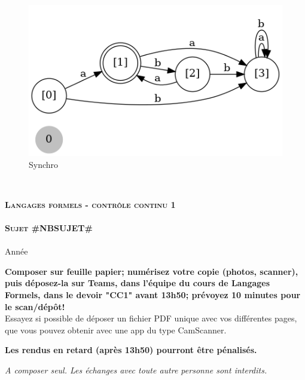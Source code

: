 \documentclass[]{article}
\begin{document}
\begin{enumerate}
\begin{figure}[htbp]
            \centering
            \includegraphics[width=15cm]{automateSynchro.png}
            \caption{Synchro}\label{fig:3.1}
        \end{figure}\\
    \end{enumerate}
    \setcounter{section}{0}
    \newpage


    \begin{center}
    {\Large \textbf{\textsc{Langages formels - contrôle continu 1}}}
        \\
        ~\\
        {\Huge \textbf{\textsc{Sujet #NBSUJET#}}}\\
        ~\\
        Année \the\year
    \end{center}

    \vskip 5mm
    \textbf{Composer sur feuille papier; numérisez votre copie (photos, scanner), puis déposez-la sur Teams, dans l'équipe du cours de Langages Formels, dans le devoir "CC1" avant 13h50; prévoyez 10 minutes pour le scan/dépôt!} \\

    Essayez si possible de déposer un fichier PDF unique avec vos différentes pages, que vous pouvez obtenir avec une app du type CamScanner.


    \textbf{Les rendus en retard (après 13h50) pourront être pénalisés.}


    \emph{A composer seul. Les échanges avec toute autre personne sont interdits.}\\
\end{document}
